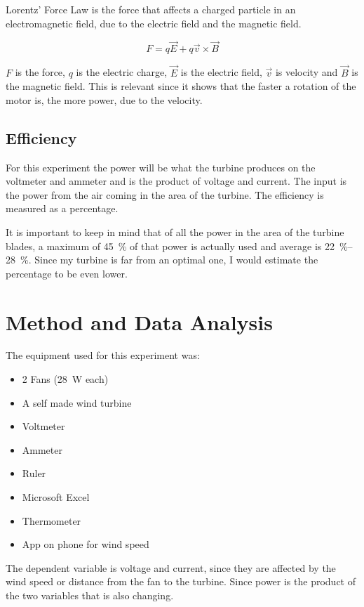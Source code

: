 \documentclass[12pt]{article}
\begin{document}
Lorentz' Force Law is the force that affects a charged particle in an electromagnetic field, due to the electric field and the magnetic field.

\begin{equation}
  F = q \vec{E} + q \vec{v} \times \vec{B}
\end{equation}

$F$ is the force, $q$ is the electric charge, $\vec{E}$ is the electric field, $\vec{v}$ is velocity and $\vec{B}$ is the magnetic field. 
This is relevant since it shows that the faster a rotation of the motor is, the more power, due to the velocity.

\subsection{Efficiency}

For this experiment the power will be what the turbine produces on the voltmeter and ammeter and is the product of voltage and current.
The input is the power from the air coming in the area of the turbine.
The efficiency is measured as a percentage.

It is important to keep in mind that of all the power in the area of the turbine blades, a maximum of \SI{45}{\percent} of that power is actually used and average is \SIrange{22}{28}{\percent}.
Since my turbine is far from an optimal one, I would estimate the percentage to be even lower.

\section{Method and Data Analysis}

The equipment used for this experiment was:
\begin{itemize}
  \item 2 Fans (\SI{28}{\watt} each)
  \item A self made wind turbine
  \item Voltmeter 
  \item Ammeter 
  \item Ruler
  \item Microsoft Excel
  \item Thermometer
  \item App on phone for wind speed
\end{itemize}

The dependent variable is voltage and current, since they are affected by the wind speed or distance from the fan to the turbine.
Since power is the product of the two variables that is also changing.
\end{document}
